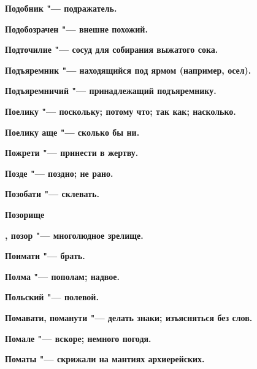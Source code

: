 \bfseries Подобник \normalfont{} "--- подражатель. 




\bfseries Подобозрачен \normalfont{} "--- внешне похожий. 




\bfseries Подточилие \normalfont{} "--- сосуд для собирания выжатого сока. 




\bfseries Подъяремник \normalfont{} "--- находящийся под ярмом (например, осел). 




\bfseries Подъяремничий \normalfont{} "--- принадлежащий подъяремнику. 




\bfseries Поелику \normalfont{} "--- поскольку; потому что; так как; насколько. 




\bfseries Поелику аще \normalfont{} "--- сколько бы ни. 




\bfseries Пожрети \normalfont{} "--- принести в жертву. 




\bfseries Позде \normalfont{} "--- поздно; не рано. 




\bfseries Позобати \normalfont{} "--- склевать. 




\bfseries Позорище \normalfont{}




\bfseries , позор \normalfont{} "--- многолюдное зрелище. 




\bfseries Поимати \normalfont{} "--- брать. 




\bfseries Полма \normalfont{} "--- пополам; надвое. 




\bfseries Польский \normalfont{} "--- полевой. 




\bfseries Помавати, поманути \normalfont{} "--- делать знаки; изъясняться без слов. 




\bfseries Помале \normalfont{} "--- вскоре; немного погодя. 




\bfseries Поматы \normalfont{} "--- скрижали на мантиях архиерейских. 




